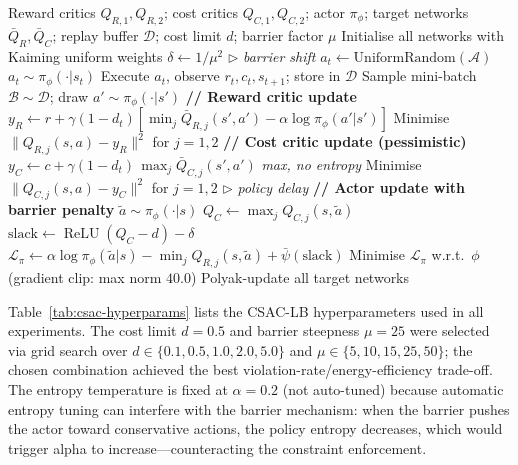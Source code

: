 \begin{algorithm}[htbp]
\caption{CSAC-LB Training (adapted from Zhang et~al.~\cite{zhang2024csaclb})}
\label{alg:csac-lb}
\begin{algorithmic}[1]
\REQUIRE Reward critics $Q_{R,1}, Q_{R,2}$; cost critics $Q_{C,1}, Q_{C,2}$;
  actor $\pi_\phi$; target networks $\bar{Q}_{R}, \bar{Q}_{C}$;
  replay buffer $\mathcal{D}$; cost limit $d$; barrier factor $\mu$
\STATE Initialise all networks with Kaiming uniform weights
\STATE $\delta \gets 1/\mu^2$ \hfill $\triangleright$ \textit{barrier shift}
    \STATE $a_t \gets \text{UniformRandom}(\mathcal{A})$
  \ELSE
    \STATE $a_t \sim \pi_\phi(\cdot | s_t)$
  \ENDIF
  \STATE Execute $a_t$, observe $r_t, c_t, s_{t+1}$; store in $\mathcal{D}$
    \STATE Sample mini-batch $\mathcal{B} \sim \mathcal{D}$; draw $a' \sim \pi_\phi(\cdot|s')$
    \STATE \textbf{// Reward critic update}
    \STATE $y_R \gets r + \gamma(1-d_t)[\min_j \bar{Q}_{R,j}(s',a') - \alpha \log \pi_\phi(a'|s')]$
    \STATE Minimise $\|Q_{R,j}(s,a) - y_R\|^2$ for $j=1,2$
    \STATE \textbf{// Cost critic update (pessimistic)}
    \STATE $y_C \gets c + \gamma(1-d_t)\,\max_j \bar{Q}_{C,j}(s',a')$
      \hfill \textit{max, no entropy}
    \STATE Minimise $\|Q_{C,j}(s,a) - y_C\|^2$ for $j=1,2$
     \hfill $\triangleright$ \textit{policy delay}
      \STATE \textbf{// Actor update with barrier penalty}
      \STATE $\tilde{a} \sim \pi_\phi(\cdot | s)$
      \STATE $Q_C \gets \max_j Q_{C,j}(s, \tilde{a})$
      \STATE $\text{slack} \gets \operatorname{ReLU}(Q_C - d) - \delta$
      \STATE $\mathcal{L}_\pi \gets \alpha \log \pi_\phi(\tilde{a}|s) - \min_j Q_{R,j}(s,\tilde{a}) + \bar{\psi}(\text{slack})$
      \STATE Minimise $\mathcal{L}_\pi$ w.r.t.\ $\phi$ (gradient clip: max norm $40.0$)
      \STATE Polyak-update all target networks
    \ENDIF
  \ENDIF
\ENDFOR
\end{algorithmic}
\end{algorithm}

Table~\ref{tab:csac-hyperparams} lists the CSAC-LB hyperparameters used in
all experiments.  The cost limit $d = 0.5$ and barrier steepness $\mu = 25$
were selected via grid search over $d \in \{0.1, 0.5, 1.0, 2.0, 5.0\}$ and
$\mu \in \{5, 10, 15, 25, 50\}$; the chosen combination achieved the best
violation-rate/energy-efficiency trade-off.  The entropy temperature is fixed
at $\alpha = 0.2$ (not auto-tuned) because automatic entropy tuning can
interfere with the barrier mechanism: when the barrier pushes the actor toward
conservative actions, the policy entropy decreases, which would trigger alpha
to increase---counteracting the constraint enforcement.

